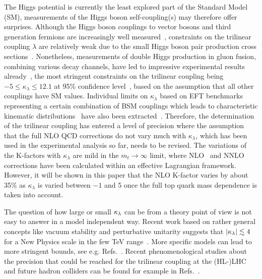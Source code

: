 The Higgs potential is currently the least explored part of the Standard Model (SM), measurements of the Higgs boson self-coupling(s) may therefore offer surprises.
Although the Higgs boson couplings to vector bosons and third generation fermions are increasingly well measured~\cite{Khachatryan:2016vau,Aaboud:2017vzb,ATLAS:2018doi,Sirunyan:2018koj,Sirunyan:2018sgc}, constraints on the trilinear coupling $\lambda$ are relatively weak due to the small Higgs boson pair production cross sections~\cite{Baglio:2012np,Frederix:2014hta}.  
Nonetheless, measurements of double Higgs production in gluon fusion, combining various decay channels,  have led to impressive experimental results already~\cite{Sirunyan:2018two,Sirunyan:2018iwt,Aad:2019uzh,Aaboud:2018ftw}, 
the most stringent constraints on the trilinear coupling being $-5\leq \kappa_\lambda\leq 12.1$
 at 95\% confidence level~\cite{Aad:2019uzh}, based on the assumption that all other couplings have SM values.
Individual limits on $\kappa_\lambda$ based on EFT benchmarks representing a certain combination of BSM couplings which leads to characteristic kinematic distributions~\cite{Carvalho:2015ttv,Carvalho:2016rys,Buchalla:2018yce} have also been extracted~\cite{Sirunyan:2018two,Sirunyan:2018iwt}.
Therefore, the determination of the trilinear coupling has entered a level of precision where the assumption that the full NLO QCD corrections do not vary much with $\kappa_\lambda$, which has been used in the experimental analysis so far, needs to be revised.
The variations of the K-factors with $\kappa_\lambda$ are mild in the $m_t\to \infty$ limit, where NLO~\cite{Grober:2015cwa,Grober:2017gut} and NNLO~\cite{deFlorian:2017qfk} corrections have been calculated within an effective Lagrangian framework.
However, it will be shown in this paper that the NLO K-factor varies by about 35\% as $\kappa_\lambda$ is varied between $-1$ and 5 once the full top quark mass dependence is taken into account. 

The question of how large or small $\kappa_{\lambda}$ can be from a theory point of view is not easy to answer in a model independent way. 
Recent work based on rather general concepts like vacuum stability and perturbative unitarity suggests that $|\kappa_{\lambda}|\lesssim 4$ for a New Physics scale in the few TeV range~\cite{Falkowski:2019tft,Chang:2019vez,DiLuzio:2017tfn,DiVita:2017eyz}.
More specific models can lead to more stringent bounds, see e.g. Refs.~\cite{Braathen:2019pxr,Basler:2018dac,Babu:2018uik,Lewis:2017dme}.
Recent phenomenological studies about the precision that could be reached for the trilinear coupling at the (HL-)LHC and future hadron colliders can be found for example in Refs.~\cite{Cepeda:2019klc,Li:2019uyy,Homiller:2018dgu,Bizon:2018syu,Goncalves:2018yva,Kim:2018uty,Adhikary:2017jtu,Corbett:2017ieo,Alves:2017ued,Cao:2016zob,Azatov:2015oxa}.

